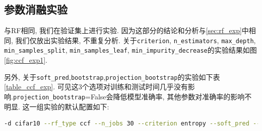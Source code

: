\documentclass[a4paper]{article}
\begin{document}
\subsection{参数消融实验}
与RF相同, 我们在验证集上进行实验. 因为这部分的结论和分析与\ref{sec:rf_exp}中相同, 我们仅放出实验结果, 不重复分析. 关于\texttt{criterion},  \texttt{n\_estimators}, \texttt{max\_depth}, \texttt{min\_samples\_split}, \texttt{min\_samples\_leaf}, \texttt{min\_impurity\_decrease}的实验结果如图\ref{fig:ccf_exp1}. 

另外, 关于\texttt{soft\_pred},\texttt{bootstrap},\texttt{projection\_bootstrap}的实验如下表\ref{table_ccf_exp}. 可见这3个选项对训练和测试时间几乎没有影响.\texttt{projection\_bootstrap}=False会降低模型准确率, 其他参数对准确率的影响不明显. 这一组实验的默认配置如下:
 \begin{lstlisting}[language=bash]
-d cifar10 --rf_type ccf --n_jobs 30 --criterion entropy --soft_pred --n_estimators 65 --max_depth 27 --min_samples_split 2 --min_samples_leaf 56 --min_impurity_decrease 2.07e-14
\end{lstlisting}
\end{document}
